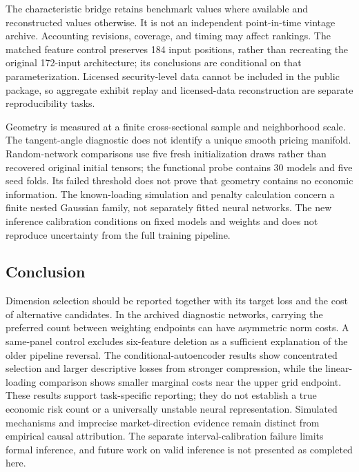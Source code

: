 The characteristic bridge retains benchmark values where available and reconstructed values otherwise. It is not an independent point-in-time vintage archive. Accounting revisions, coverage, and timing may affect rankings. The matched feature control preserves 184 input positions, rather than recreating the original 172-input architecture; its conclusions are conditional on that parameterization. Licensed security-level data cannot be included in the public package, so aggregate exhibit replay and licensed-data reconstruction are separate reproducibility tasks.

Geometry is measured at a finite cross-sectional sample and neighborhood scale. The tangent-angle diagnostic does not identify a unique smooth pricing manifold. Random-network comparisons use five fresh initialization draws rather than recovered original initial tensors; the functional probe contains 30 models and five seed folds. Its failed threshold does not prove that geometry contains no economic information. The known-loading simulation and penalty calculation concern a finite nested Gaussian family, not separately fitted neural networks. The new inference calibration conditions on fixed models and weights and does not reproduce uncertainty from the full training pipeline.

\subsection{Conclusion}
Dimension selection should be reported together with its target loss and the cost of alternative candidates. In the archived diagnostic networks, carrying the preferred count between weighting endpoints can have asymmetric norm costs. A same-panel control excludes six-feature deletion as a sufficient explanation of the older pipeline reversal. The conditional-autoencoder results show concentrated selection and larger descriptive losses from stronger compression, while the linear-loading comparison shows smaller marginal costs near the upper grid endpoint. These results support task-specific reporting; they do not establish a true economic risk count or a universally unstable neural representation. Simulated mechanisms and imprecise market-direction evidence remain distinct from empirical causal attribution. The separate interval-calibration failure limits formal inference, and future work on valid inference is not presented as completed here.
